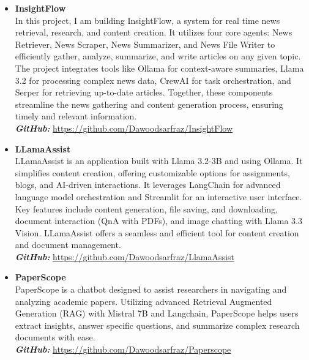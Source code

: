 \documentclass[a4paper,12pt]{article}
\begin{document}
\begin{itemize}
\item \textbf{InsightFlow} \\
In this project, I am building InsightFlow, a system for real time news retrieval, research, and content creation. It utilizes four core agents: News Retriever, News Scraper, News Summarizer, and News File Writer to efficiently gather, analyze, summarize, and write articles on any given topic. The project integrates tools like Ollama for context-aware summaries, Llama 3.2 for processing complex news data, CrewAI for task orchestration, and Serper for retrieving up-to-date articles. Together, these components streamline the news gathering and content generation process, ensuring timely and relevant information. \\
\textbf{\textit{GitHub:}} \href{https://github.com/Dawoodsarfraz/InsightFlow}{https://github.com/Dawoodsarfraz/InsightFlow}
	
	
\item \textbf{LLamaAssist} \\
LLamaAssist is an application built with Llama 3.2-3B and using Ollama. It simplifies content creation, offering customizable options for assignments, blogs, and AI-driven interactions. It leverages LangChain for advanced language model orchestration and Streamlit for an interactive user interface. Key features include content generation, file saving, and downloading, document interaction (QnA with PDFs), and image chatting with Llama 3.3 Vision. LLamaAssist offers a seamless and efficient tool for content creation and document management. \\
\textbf{\textit{GitHub:}} \href{https://github.com/Dawoodsarfraz/LlamaAssist}{https://github.com/Dawoodsarfraz/LlamaAssist}


\item \textbf{PaperScope} \\
PaperScope is a chatbot designed to assist researchers in navigating and analyzing academic papers. Utilizing advanced Retrieval Augmented Generation (RAG) with Mistral 7B and Langchain, PaperScope helps users extract insights, answer specific questions, and summarize complex research documents with ease. \\
\textbf{\textit{GitHub:}} \href{https://github.com/Dawoodsarfraz/Paperscope}{https://github.com/Dawoodsarfraz/Paperscope}
	

\end{itemize}
\end{document}
